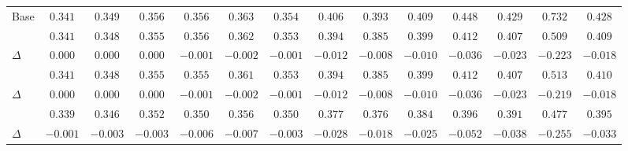 \begin{table}[t]
{\begin{tabular}{@{}l*{13}{c}@{}}
Base & $0.341$ & $0.349$ & $0.356$ & $0.356$ & $0.363$ & $0.354$ & $0.406$ & $0.393$ & $0.409$ & $0.448$ & $0.429$ & $0.732$ & $0.428$ \\
\raft{} & $0.341$ & $0.348$ & $0.355$ & $0.356$ & $0.362$ & $0.353$ & $0.394$ & $0.385$ & $0.399$ & $0.412$ & $0.407$ & $0.509$ & $0.409$ \\
\quad $\Delta$ & $0.000$ & $0.000$ & $0.000$ & $-0.001$ & $-0.002$ & $-0.001$ & $-0.012$ & $-0.008$ & $-0.010$ & $-0.036$ & $-0.023$ & $-0.223$ & $-0.018$ \\
\saraf{} & $0.341$ & $0.348$ & $0.355$ & $0.355$ & $0.361$ & $0.353$ & $0.394$ & $0.385$ & $0.399$ & $0.412$ & $0.407$ & $0.513$ & $0.410$ \\
\quad $\Delta$ & $0.000$ & $0.000$ & $0.000$ & $-0.001$ & $-0.002$ & $-0.001$ & $-0.012$ & $-0.008$ & $-0.010$ & $-0.036$ & $-0.023$ & $-0.219$ & $-0.018$ \\
\method{} & $\mathbf{0.339}$ & $\mathbf{0.346}$ & $\mathbf{0.352}$ & $\mathbf{0.350}$ & $\mathbf{0.356}$ & $\mathbf{0.350}$ & $\mathbf{0.377}$ & $\mathbf{0.376}$ & $\mathbf{0.384}$ & $\mathbf{0.396}$ & $\mathbf{0.391}$ & $\mathbf{0.477}$ & $\mathbf{0.395}$ \\
\quad $\Delta$ & $\mathbf{-0.001}$ & $\mathbf{-0.003}$ & $\mathbf{-0.003}$ & $\mathbf{-0.006}$ & $\mathbf{-0.007}$ & $\mathbf{-0.003}$ & $\mathbf{-0.028}$ & $\mathbf{-0.018}$ & $\mathbf{-0.025}$ & $\mathbf{-0.052}$ & $\mathbf{-0.038}$ & $\mathbf{-0.255}$ & $\mathbf{-0.033}$ \\
\bottomrule
\end{tabular}
}
\end{table}
